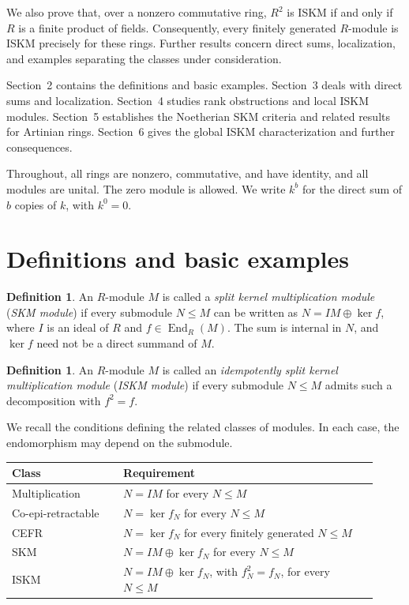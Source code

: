 \documentclass[11pt,a4paper]{article}
\theoremstyle{definition}
\newtheorem{definition}[theorem]{Definition}
\theoremstyle{remark}
\begin{document}
We also prove that, over a nonzero commutative ring, $R^2$ is ISKM if and only if $R$ is a finite product of fields. Consequently, every finitely generated $R$-module is ISKM precisely for these rings. Further results concern direct sums, localization, and examples separating the classes under consideration.

Section~2 contains the definitions and basic examples. Section~3 deals with direct sums and localization. Section~4 studies rank obstructions and local ISKM modules. Section~5 establishes the Noetherian SKM criteria and related results for Artinian rings. Section~6 gives the global ISKM characterization and further consequences.

Throughout, all rings are nonzero, commutative, and have identity, and all modules are unital. The zero module is allowed. We write $k^b$ for the direct sum of $b$ copies of $k$, with $k^0=0$.

\section{Definitions and basic examples}

\begin{definition}
An $R$-module $M$ is called a \emph{split kernel multiplication module} (\emph{SKM module}) if every submodule $N\leq M$ can be written as $N=IM\oplus\ker f$, where $I$ is an ideal of $R$ and $f\in\operatorname{End}_R(M)$. The sum is internal in $N$, and $\ker f$ need not be a direct summand of $M$.
\end{definition}

\begin{definition}
An $R$-module $M$ is called an \emph{idempotently split kernel multiplication module} (\emph{ISKM module}) if every submodule $N\leq M$ admits such a decomposition with $f^2=f$.
\end{definition}

We recall the conditions defining the related classes of modules. In each case, the endomorphism may depend on the submodule.

\begin{center}
{\small
\renewcommand{\arraystretch}{1.22}
\begin{tabular}{@{}p{0.28\linewidth}p{0.64\linewidth}@{}}
\toprule
Class & Requirement \\
\midrule
Multiplication & $N=IM$ for every $N\leq M$ \\
Co-epi-retractable & $N=\ker f_N$ for every $N\leq M$ \\
CEFR & $N=\ker f_N$ for every finitely generated $N\leq M$ \\
SKM & $N=IM\oplus\ker f_N$ for every $N\leq M$ \\
ISKM & $N=IM\oplus\ker f_N$, with $f_N^2=f_N$, for every $N\leq M$ \\
\bottomrule
\end{tabular}
}
\end{center}
\end{document}
